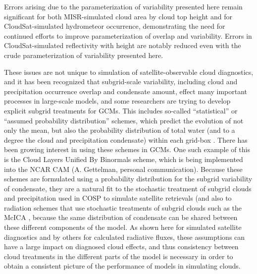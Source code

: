 Errors arising due to the parameterization of variability presented here
remain significant for both MISR-simulated cloud area by cloud top
height and for CloudSat-simulated hydrometeor occurrence, demonstrating
the need for continued efforts to improve parameterization of overlap
and variability. Errors in CloudSat-simulated reflectivity with height
are notably reduced even with the crude parameterization of variability
presented here.

These issues are not unique to simulation of satellite-observable cloud
diagnostics, and it has been recognized that subgrid-scale variability,
including cloud and precipitation occurrence overlap and condensate
amount, effect many important processes in large-scale models, and some
researchers are trying to develop explicit subgrid treatments for GCMs.
This includes so-called ``statistical'' or ``assumed probability
distribution'' schemes, which predict the evolution of not only the
mean, but also the probability distribution of total water (and to a
degree the cloud and precipitation condensate) within each grid-box
\citep[e.g.,][]{tompkins_2002}. There has been growing interest in using
these schemes in GCMs. One such example of this is the Cloud Layers
Unified By Binormals \citep[CLUBB;][]{golaz_et_al_2002} scheme, which is
being implemented into the NCAR CAM (A. Gettelman, personal
communication). Because these schemes are formulated using a probability
distribution for the subgrid variability of condensate, they are a
natural fit to the stochastic treatment of subgrid clouds and
precipitation used in COSP to simulate satellite retrievals (and also to
radiation schemes that use stochastic treatments of subgrid clouds such
as the McICA \citep{pincus_et_al_2003}, because the same distribution of
condensate can be shared between these different components of the
model. As shown here for simulated satellite diagnostics and by others
for calculated radiative fluxes, these assumptions can have a large
impact on diagnosed cloud effects, and thus consistency between cloud
treatments in the different parts of the model is necessary in order to
obtain a consistent picture of the performance of models in simulating
clouds.

